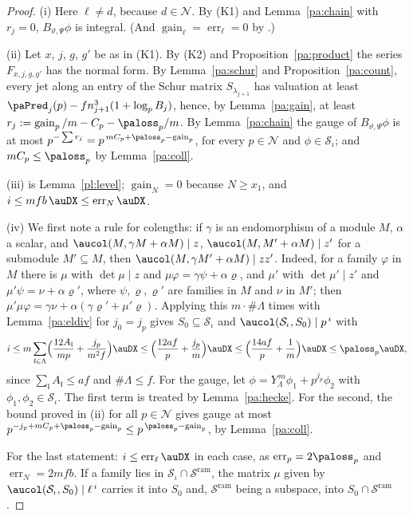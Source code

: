 \documentclass[10pt]{amsart}
\theoremstyle{definition}
\theoremstyle{remark}
\providecommand{\auS}{\mathcal S}
\providecommand{\auSram}{\mathcal S^{\mathrm{ram}}}
\providecommand{\auerr}{\operatorname{err}}
\providecommand{\augain}{\operatorname{gain}}
\begin{document}
\begin{proof}
(i) Here $\ell\ne d$, because $d\in\mathcal N$. By (K1) and Lemma~\ref{pa:chain} with $r_j=0$,
$B_{\vartheta,\Psi}\phi$ is integral. (And $\augain_\ell=\auerr_\ell=0$ by
{\cite[Lemma~14.9(a)]{P46}}.)

(ii) Let $x$, $j$, $g$, $g'$ be as in (K1). By (K2) and Proposition~\ref{pa:product} the series
$F_{x,j,g,g'}$ has the normal form. By Lemma~\ref{pa:schur} and Proposition~\ref{pa:count}, every
jet along an entry of the Schur matrix $S_{\lambda_{j+1}}$ has valuation at least
$\paPred_j(p)-fn_{j+1}^3(1+\log_pB_j)$, hence, by Lemma~\ref{pa:gain}, at least
$r_j:=\augain_p/m-C_p-\paloss_p/m$. By Lemma~\ref{pa:chain} the gauge of $B_{\vartheta,\Psi}\phi$
is at most $p^{-\sum r_j}=p^{\,mC_p+\paloss_p-\augain_p}$, for every $p\in\mathcal N$ and
$\phi\in\auS_\iota$; and $mC_p\le\paloss_p$ by Lemma~\ref{pa:coll}.

(iii) is Lemma~\ref{pl:level}; $\augain_N=0$ because $N\ge x_1$, and $i\le mfb\,\auDX\le\auerr_N\auDX$.

(iv) We first note a rule for colengths: if $\gamma$ is an endomorphism of a module $M$,
$\alpha$ a scalar, and $\aucol(M,\gamma M+\alpha M)\mid z$, $\aucol(M,M'+\alpha M)\mid z'$ for a
submodule $M'\subseteq M$, then $\aucol(M,\gamma M'+\alpha M)\mid zz'$. Indeed, for a family
$\varphi$ in $M$ there is $\mu$ with $\det\mu\mid z$ and $\mu\varphi=\gamma\psi+\alpha\varrho$, and
$\mu'$ with $\det\mu'\mid z'$ and $\mu'\psi=\nu+\alpha\varrho'$, where $\psi,\varrho,\varrho'$ are
families in $M$ and $\nu$ in $M'$; then $\mu'\mu\varphi=\gamma\nu+\alpha(\gamma\varrho'+\mu'
\varrho)$. Applying this $m\cdot\#\Lambda$ times with Lemma~\ref{pa:eldiv} for $j_0=j_p$ gives
$S_0\subseteq\auS_\iota$ and $\aucol(\auS_\iota,S_0)\mid p^{\,i}$ with
\[
i\le m\sum_{\mathfrak l\in\Lambda}\Bigl(\frac{12A_{\mathfrak l}}{mp}+\frac{j_p}{m^2f}\Bigr)\auDX
\le\Bigl(\frac{12af}p+\frac{j_p}m\Bigr)\auDX\le\Bigl(\frac{14af}p+\frac1m\Bigr)\auDX\le\paloss_p
\auDX,
\]
since $\sum_{\mathfrak l}A_{\mathfrak l}\le af$ and $\#\Lambda\le f$. For the gauge, let
$\phi=Y_\Lambda^{\,m}\phi_1+p^{j_p}\phi_2$ with $\phi_1,\phi_2\in\auS_\iota$. The first term is
treated by Lemma~\ref{pa:hecke}. For the second, the bound proved in (ii) for all $p\in\mathcal N$
gives gauge at most $p^{-j_p+mC_p+\paloss_p-\augain_p}\le p^{\,\paloss_p-\augain_p}$, by
Lemma~\ref{pa:coll}.

For the last statement: $i\le\auerr_\ell\auDX$ in each case, as $\auerr_p=2\paloss_p$ and
$\auerr_N=2mfb$. If a family lies in $\auS_\iota\cap\auSram$, the matrix $\mu$ given by
$\aucol(\auS_\iota,S_0)\mid\ell^{\,i}$ carries it into $S_0$ and, $\auSram$ being a subspace, into
$S_0\cap\auSram$.
\end{proof}
\end{document}
